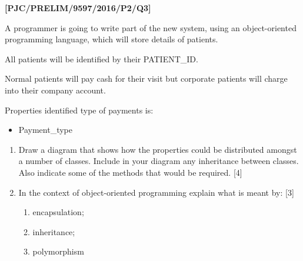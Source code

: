\item \textbf{{[}PJC/PRELIM/9597/2016/P2/Q3{]} }

A programmer is going to write part of the new system, using an object-oriented
programming language, which will store details of patients. 

All patients will be identified by their PATIENT\_ID. 

Normal patients will pay cash for their visit but corporate patients
will charge into their company account.

Properties identified type of payments is: 
\begin{itemize}
\item Payment\_type 
\end{itemize}
\begin{enumerate}
\item Draw a diagram that shows how the properties could be distributed
amongst a number of classes. Include in your diagram any inheritance
between classes. Also indicate some of the methods that would be required.
\hfill{}{[}4{]} 
\item In the context of object-oriented programming explain what is meant
by: \hfill{}{[}3{]} 
\begin{enumerate}
\item encapsulation; 
\item inheritance;
\item polymorphism 
\end{enumerate}
\end{enumerate}